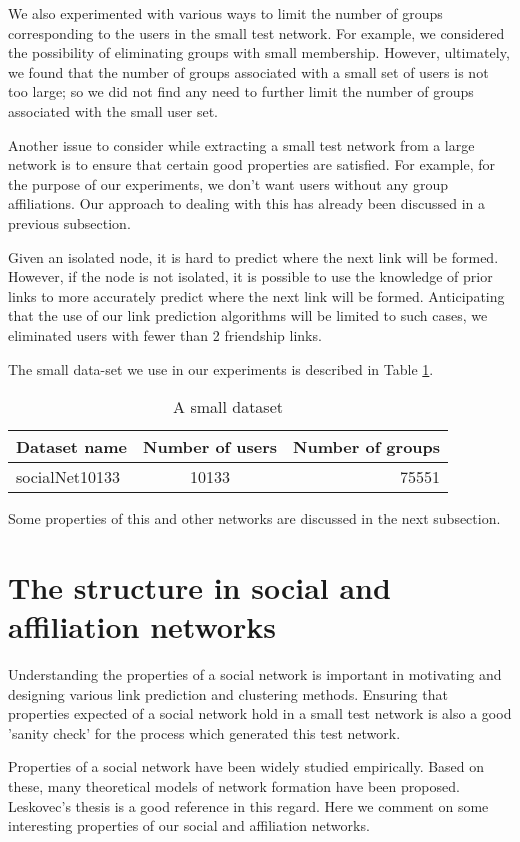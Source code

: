 \documentclass{report}
\begin{document}
We also experimented with various ways to limit the number of groups corresponding to the users in the small test network. For example, we considered the possibility of eliminating groups with small membership. However, ultimately, we found that the number of groups associated with a small set of users is not too large; so we did not find any need to further limit the number of groups associated with the small user set.

Another issue to consider while extracting a small test network from a large network is to ensure that certain good properties are satisfied. For example, for the purpose of our experiments, we don't want users without any group affiliations. Our approach to dealing with this has already been discussed in a previous subsection.

Given an isolated node, it is hard to predict where the next link will be formed. However, if the node is not isolated, it is possible to use the knowledge of prior links to more accurately predict where the next link will be formed. Anticipating that the use of our link prediction algorithms will be limited to such cases, we eliminated users with fewer than 2 friendship links.

The small data-set we use in our experiments is described in Table \ref{tab:datasets}.
\begin{table}
\centering
\begin{tabular}{|l || c | r |}
\hline
Dataset name& Number of users & Number of groups\\
\hline
socialNet10133 & 10133 & 75551\\
\hline
\end{tabular}
\caption{A small dataset}
\label{tab:datasets}
\end{table}

Some properties of this and other networks are discussed in the next subsection.

\section{The structure in social and affiliation networks}
Understanding the properties of a social network is important in motivating and designing various link prediction and clustering methods. Ensuring that properties expected of a social network hold in a small test network is also a good 'sanity check' for the process which generated this test network.

Properties of a social network have been widely studied empirically. Based on these, many theoretical models of network formation have been proposed. Leskovec's thesis \cite{leskovecThesis} is a good reference in this regard. Here we comment on some interesting properties of our social and affiliation networks.
\end{document}

